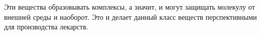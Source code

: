 \begin{lecture}
\begin{lecSection}
\begin{lecSection}
			Эти вещества образовывать комплексы, а значит, и могут защищать молекулу от внешней среды и наоборот. Это и делает данный класс веществ перспективными для производства лекарств.
		\end{lecSection}
	\end{lecSection}
	
\end{lecture}
